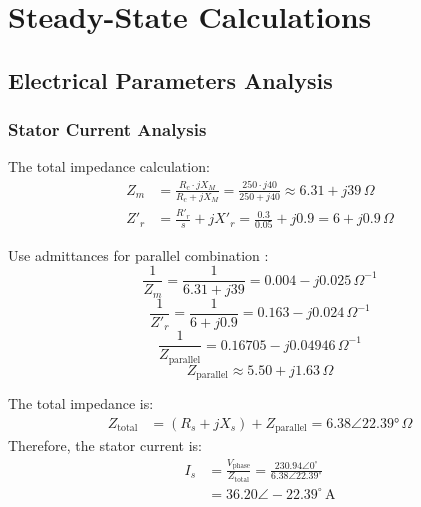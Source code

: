 \documentclass[a4paper,11pt]{IEEEtran}
\begin{document}
\section{Steady-State Calculations}
\label{sec:results}

\subsection{Electrical Parameters Analysis}

\subsubsection{Stator Current Analysis}
The total impedance calculation:
\begin{align}
    Z_m &= \frac{R_c \cdot jX_M}{R_c + jX_M} = \frac{250 \cdot j40}{250 + j40} \approx 6.31 + j39\,\Omega \\
    Z'_r &= \frac{R'_r}{s} + jX'_r = \frac{0.3}{0.05} + j0.9 = 6 + j0.9\,\Omega
\end{align}


Use admittances for parallel combination :
\begin{equation}
    \frac{1}{Z_m} = \frac{1}{6.31 + j39} = 0.004 - j0.025\,\Omega^{-1}
\end{equation}
\begin{equation}
    \frac{1}{Z'_r} = \frac{1}{6 + j0.9} = 0.163 - j0.024\,\Omega^{-1}
\end{equation}
\begin{equation}
    \frac{1}{Z_{\text{parallel}}} = 0.16705 - j0.04946\,\Omega^{-1}
\end{equation}
\begin{equation}
    Z_{\text{parallel}} \approx 5.50 + j1.63\,\Omega
\end{equation}



The total impedance is:
\begin{align}
    Z_{\text{total}} &= (R_s + jX_s) + Z_{\text{parallel}}= 6.38\angle 22.39°\,\Omega
\end{align}
Therefore, the stator current is:
\begin{equation}
\begin{split}
    I_s &= \frac{V_{\text{phase}}}{Z_{\text{total}}} = \frac{230.94\angle 0^\circ}{6.38\angle 22.39^\circ} \\
    &= 36.20\angle -22.39^\circ\,\text{A}
\end{split}
\end{equation}
\end{document}

